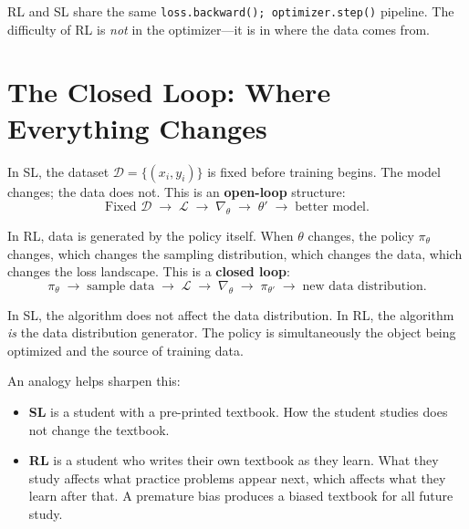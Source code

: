 \begin{keyidea}
RL and SL share the same \texttt{loss.backward(); optimizer.step()} pipeline.
The difficulty of RL is \emph{not} in the optimizer---it is in where the data comes from.
\end{keyidea}

\section{The Closed Loop: Where Everything Changes}
\label{sec:closed-loop}

In SL, the dataset $\mathcal{D} = \{(x_i, y_i)\}$ is fixed before training begins.
The model changes; the data does not.
This is an \textbf{open-loop} structure:
%
\begin{equation}
\text{Fixed } \mathcal{D} \;\longrightarrow\; \mathcal{L} \;\longrightarrow\; \nabla_\theta \;\longrightarrow\; \theta' \;\longrightarrow\; \text{better model.}
\end{equation}

In RL, data is generated by the policy itself.
When $\theta$ changes, the policy $\pi_\theta$ changes, which changes the sampling distribution, which changes the data, which changes the loss landscape.
This is a \textbf{closed loop}:
%
\begin{equation}
\pi_\theta \;\longrightarrow\; \text{sample data} \;\longrightarrow\; \mathcal{L} \;\longrightarrow\; \nabla_\theta \;\longrightarrow\; \pi_{\theta'} \;\longrightarrow\; \text{new data distribution.}
\end{equation}

\begin{keyidea}
In SL, the algorithm does not affect the data distribution.
In RL, the algorithm \emph{is} the data distribution generator.
The policy is simultaneously the object being optimized and the source of training data.
\end{keyidea}

An analogy helps sharpen this:
\begin{itemize}
    \item \textbf{SL} is a student with a pre-printed textbook.
          How the student studies does not change the textbook.
    \item \textbf{RL} is a student who writes their own textbook as they learn.
          What they study affects what practice problems appear next,
          which affects what they learn after that.
          A premature bias produces a biased textbook for all future study.
\end{itemize}

